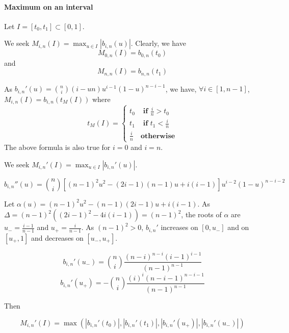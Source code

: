 \documentclass {article}
\newcommand\bernstein[2]{b_{#1, #2}}
\begin{document}
\paragraph{Maximum on an interval}
Let $I = \left[ t_0, t_1 \right] \subset \left[ 0,1 \right]$.

We seek $ M_{i,n} (I) = \max_{u \in I} |\bernstein{i}{n} (u)| $.
Clearly, we have
$$ M_{0, n} (I) = \bernstein{0}{n} (t_0) $$
and
$$ M_{n, n} (I) = \bernstein{n}{n} (t_1) $$

As $\bernstein{i}{n}' (u) = { n \choose i } ( i - u n ) u^{i-1} (1-u)^{n-i-1}$,
we have, $\forall i \in \left[ 1, n-1 \right]$, $ M_{i,n} (I) = \bernstein{i}{n} (t_M(I)) $
where
\begin{equation}
  t_M (I) = \left\lbrace
  \begin{array}{cl}
    t_0 & \textbf{ if } \frac{i}{n} > t_0 \\
    t_1 & \textbf{ if } t_1 < \frac{i}{n} \\
    \frac{i}{n} & \textbf{otherwise}
  \end{array}
  \right.
\end{equation}
The above formula is also true for $i = 0$ and $i=n$.

We seek $ M_{i,n}' (I) = \max_{u \in I} |\bernstein{i}{n}' (u)| $.

$$
\bernstein{i}{n}'' (u) = { n \choose i } \left[ (n-1)^2 u^2 - (2 i - 1) (n - 1) u + i (i-1) \right] u^{i-2} (1-u)^{n-i-2}
$$

Let $ \alpha(u) = (n-1)^2 u^2 - (n - 1)(2 i - 1) u + i (i-1) $.
As $\Delta = (n-1)^2 ( (2i-1)^2 - 4 i (i - 1)) = (n-1)^2$,
the roots of $\alpha$ are $ u_- = \frac{i-1}{n-1} $ and $ u_+ = \frac{i}{n-1}$.
As $(n-1)^2 > 0$, $\bernstein{i}{n}'$ increases on $\left[ 0, u_- \right]$ and on $\left[ u_+, 1\right]$
and decreases on $\left[ u_-, u_+ \right]$.

$$
\bernstein{i}{n}' (u_-) = { n \choose i } \frac{(n-i)^{n-i} (i-1)^{i-1}}{(n-1)^{n-1}}
$$
$$
\bernstein{i}{n}' (u_+) = - { n \choose i } \frac{(i)^i (n-i-1)^{n-i-1}}{(n-1)^{n-1}}
$$

Then

$$ M_{i,n}'(I) = \max(|\bernstein{i}{n}' (t_0)|,|\bernstein{i}{n}' (t_1)|,|\bernstein{i}{n}' (u_+)|,|\bernstein{i}{n}' (u_-)|)$$
\end{document}
